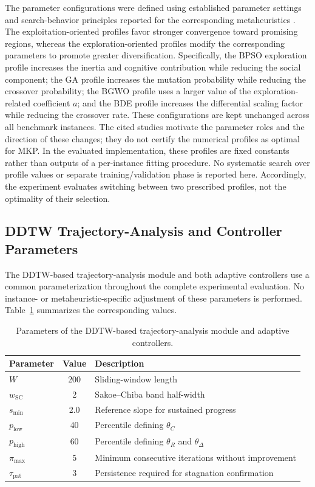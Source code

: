 \documentclass[journal,article,submit,moreauthors]{Definitions/mdpi}
\begin{document}
The parameter configurations were defined using established parameter
settings and search-behavior principles reported for the corresponding
metaheuristics \cite{clerc2002particle,goldberg1989genetic,
mirjalili2014grey,storn1997differential}. The exploitation-oriented profiles
favor stronger convergence toward promising regions, whereas the
exploration-oriented profiles modify the corresponding parameters to promote
greater diversification. Specifically, the BPSO exploration profile increases
the inertia and cognitive contribution while reducing the social component;
the GA profile increases the mutation probability while reducing the
crossover probability; the BGWO profile uses a larger value of the
exploration-related coefficient $a$; and the BDE profile increases the
differential scaling factor while reducing the crossover rate. These
configurations are kept unchanged across all benchmark instances. The
cited studies motivate the parameter roles and the direction of these
changes; they do not certify the numerical profiles as optimal for MKP.
In the evaluated implementation, these profiles are fixed constants rather
than outputs of a per-instance fitting procedure. No systematic search over
profile values or separate training/validation phase is reported here.
Accordingly, the experiment evaluates switching between two prescribed
profiles, not the optimality of their selection.


\subsection{DDTW Trajectory-Analysis and Controller Parameters}
\label{sec:dtw_config}

The DDTW-based trajectory-analysis module and both adaptive controllers use
a common parameterization throughout the complete experimental evaluation.
No instance- or metaheuristic-specific adjustment of these parameters is
performed. Table~\ref{tab:dtw_params} summarizes the corresponding values.

\begin{table}[htbp]
\centering
\caption{Parameters of the DDTW-based trajectory-analysis module and adaptive
controllers.}
\label{tab:dtw_params}
\begin{tabular}{@{}l c l@{}}
\toprule
\textbf{Parameter} & \textbf{Value} & \textbf{Description} \\
\midrule
$W$                  & 200 & Sliding-window length \\
$w_{\mathrm{SC}}$    & 2   & Sakoe--Chiba band half-width \\
$s_{\min}$           & 2.0 & Reference slope for sustained progress \\
$p_{\mathrm{low}}$   & 40  & Percentile defining $\theta_C$ \\
$p_{\mathrm{high}}$  & 60  & Percentile defining $\theta_R$ and $\theta_\Delta$ \\
$\pi_{\max}$         & 5   & Minimum consecutive iterations without improvement \\
$\tau_{\mathrm{pat}}$ & 3  & Persistence required for stagnation confirmation \\
\bottomrule
\end{tabular}
\end{table}
\end{document}
